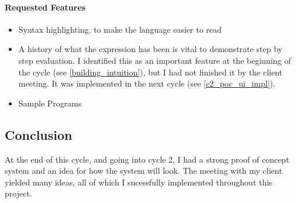 \paragraph{Requested Features}
\begin{itemize}
    \item Syntax highlighting, to make the language easier to read   
    \item A history of what the expression has been is vital to demonstrate step by step evaluation. I identified this as an important feature at the beginning of the cycle (see \ref{building_intuition}), but I had not finished it by the client meeting. It was implemented in the next cycle (see \ref{c2_poc_ui_impl}). 
    \item Sample Programs
\end{itemize}

\subsection{Conclusion}
At the end of this cycle, and going into cycle 2, I had a strong proof of concept system and an idea for how the system will look. The meeting with my client yielded many ideas, all of which I sucessfully implemented throughout this project. 